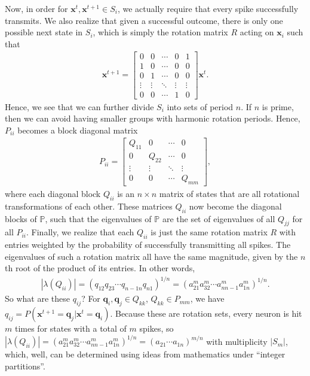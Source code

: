 \documentclass[superscriptaddress]{revtex4-1}
\newcommand{\prob}{\mathbb{P}}
\begin{document}
Now, in order for $\bm{x}^t, \bm{x}^{t+1} \in S_i$, we actually require that every spike successfully transmits. We also realize that given a successful outcome, there is only one possible next state in $S_i$, which is simply the rotation matrix $R$ acting on $\bm{x}_i$ such that
\begin{align*}
\bm{x}^{t+1} =
\begin{bmatrix}
0 & 0 & \dotsm & 0 & 1\\
1 & 0 & \dotsm & 0 & 0\\
0 & 1 & \dotsm & 0 & 0\\
\vdots & \vdots & \ddots & \vdots & \vdots\\
0 & 0 & \dotsm & 1 & 0
\end{bmatrix}
\bm{x}^t.
\end{align*}
Hence, we see that we can further divide $S_i$ into sets of period $n$. If $n$ is prime, then we can avoid having smaller groups with harmonic rotation periods. Hence, $P_{ii}$ becomes a block diagonal matrix
\begin{align*}
P_{ii} = 
\begin{bmatrix}
Q_{11} & 0 & \dotsm & 0\\
0 & Q_{22} & \dotsm & 0\\
\vdots & \vdots & \ddots & \vdots\\
0 & 0 & \dotsm & Q_{mm}
\end{bmatrix},
\end{align*}
where each diagonal block $Q_{ii}$ is an $n \times n$ matrix of states that are all rotational transformations of each other. These matrices $Q_{ii}$ now become the diagonal blocks of $\prob$, such that the eigenvalues of $\prob$ are the set of eigenvalues of all $Q_{jj}$ for all $P_{ii}$. Finally, we realize that each $Q_{ii}$ is just the same rotation matrix $R$ with entries weighted by the probability of successfully transmitting all spikes. The eigenvalues of such a rotation matrix all have the same magnitude, given by the $n$th root of the product of its entries. In other words,
\begin{align*}
|\lambda(Q_{ii})| = (q_{12}q_{23}\dotsm q_{n-1 n}q_{n1})^{1/n} = (a_{21}^m a_{32}^m \dotsm a_{n n-1}^m a_{1n}^m)^{1/n}.
\end{align*}
So what are these $q_{ij}$? For $\bm{q}_i, \bm{q}_j \in Q_{kk}$, $Q_{kk} \in P_{mm}$, we have $q_{ij} = P(\bm{x}^{t+1} = \bm{q}_j | \bm{x}^t = \bm{q}_i)$. Because these are rotation sets, every neuron is hit $m$ times for states with a total of $m$ spikes, so $|\lambda(Q_{ii})| = (a_{21}^m a_{32}^m \dotsm a_{n n-1}^m a_{1n}^m)^{1/n} = (a_{21}\dotsm a_{1n})^{m/n}$ with multiplicity $|S_m|$, which, well, can be determined using ideas from mathematics under ``integer partitions''. 
\end{document}
